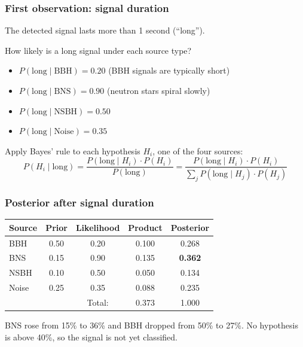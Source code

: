 \documentclass[slidestop,compress,mathserif]{beamer}
\begin{document}
\begin{frame}
\frametitle{First observation: signal duration}

The detected signal lasts more than 1 second (``long'').

\pause
\medskip

How likely is a long signal under each source type?
\begin{itemize}
\item $P(\text{long} \mid \text{BBH}) = 0.20$ \quad (BBH signals are typically short)
\item $P(\text{long} \mid \text{BNS}) = 0.90$ \quad (neutron stars spiral slowly)
\item $P(\text{long} \mid \text{NSBH}) = 0.50$
\item $P(\text{long} \mid \text{Noise}) = 0.35$
\end{itemize}

\pause
\medskip

Apply Bayes' rule to each hypothesis $H_i$, one of the four sources:
\[
P(H_i \mid \text{long})
=  \frac{P(\text{long} \mid H_i) \cdot P(H_i)}{P(\text{long})}
= \frac{P(\text{long} \mid H_i) \cdot P(H_i)}{\sum_{j} P(\text{long} \mid H_j) \cdot P(H_j)}
\]

\end{frame}

\begin{frame}
\frametitle{Posterior after signal duration}

\begin{center}
\renewcommand{\arraystretch}{1.15}
\begin{tabular}{l c c c c}
\toprule
Source & Prior & Likelihood & Product & Posterior \\
\midrule
BBH  & 0.50 & 0.20 & 0.100 & 0.268 \\
BNS  & 0.15 & 0.90 & 0.135 & \textbf{0.362} \\
NSBH & 0.10 & 0.50 & 0.050 & 0.134 \\
Noise & 0.25 & 0.35 & 0.088 & 0.235 \\
\midrule
& & Total: &  0.373 & 1.000 \\
\bottomrule
\end{tabular}
\end{center}

\pause
\medskip

BNS rose from 15\% to 36\% and BBH dropped from 50\% to 27\%. No hypothesis is above 40\%, so the signal is not yet classified.

\end{frame}
\end{document}
